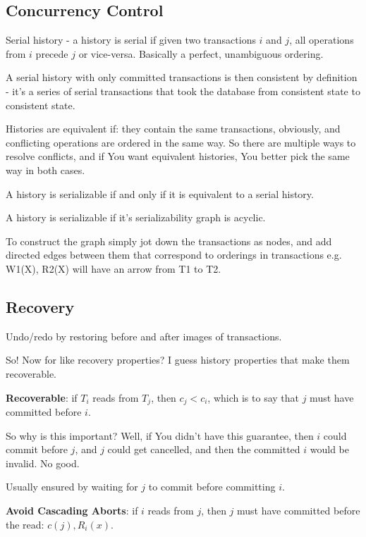 \documentclass{article}
\begin{document}
	\subsection{Concurrency Control}
	
		Serial history - a history is serial if given two transactions $i$ and $j$, all operations from $i$ precede $j$ or vice-versa. Basically a perfect, unambiguous ordering.
		
		A serial history with only committed transactions is then consistent by definition - it's a series of serial transactions that took the database from consistent state to consistent state.
		
		Histories are equivalent if: they contain the same transactions, obviously, and conflicting operations are ordered in the same way. So there are multiple ways to resolve conflicts, and if You want equivalent histories, You better pick the same way in both cases.
		
		A history is serializable if and only if it is equivalent to a serial history.
		
		A history is serializable if it's serializability graph is acyclic.
		
		To construct the graph simply jot down the transactions as nodes, and add directed edges between them that correspond to orderings in transactions e.g. W1(X), R2(X) will have an arrow from T1 to T2.
		
	\subsection{Recovery}
	
		Undo/redo by restoring before and after images of transactions.
		
		So! Now for like recovery properties? I guess history properties that make them recoverable.
		
		\textbf{Recoverable}: if $T_i$ reads from $T_j$, then $c_j < c_i$, which is to say that $j$ must have committed before $i$.
		
		So why is this important? Well, if You didn't have this guarantee, then $i$ could commit before $j$, and $j$ could get cancelled, and then the committed $i$ would be invalid. No good.
		
		Usually ensured by waiting for $j$ to commit before committing $i$.
		
		\textbf{Avoid Cascading Aborts}: if $i$ reads from $j$, then $j$ must have committed before the read: $c(j), R_i(x)$.
		
\end{document}
